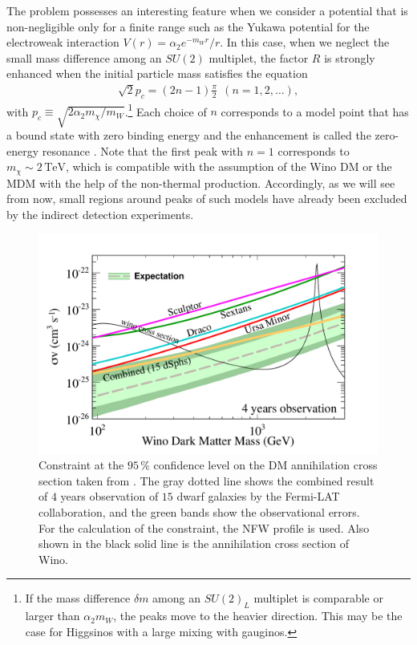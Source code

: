 \documentclass[12pt,twoside,book]{article}
\begin{document}
The problem possesses an interesting feature when we consider a potential that is non-negligible only for a finite range such as the Yukawa potential for the electroweak interaction $V(r) = \alpha_2 e^{-m_W r} / r$.
In this case, when we neglect the small mass difference among an $SU(2)$ multiplet, the factor $R$ is strongly enhanced when the initial particle mass satisfies the equation
\begin{align}
  \sqrt{2} p_c = (2n - 1) \frac{\pi}{2}~~(n = 1, 2, \dots),
\end{align}
with $p_c \equiv \sqrt{2 \alpha_2 m_\chi / m_W}$.\footnote{
  If the mass difference $\delta m$ among an $SU(2)_L$ multiplet is comparable or larger than $\alpha_2 m_W$, the peaks move to the heavier direction.
  This may be the case for Higgsinos with a large mixing with gauginos.
}
Each choice of $n$ corresponds to a model point that has a bound state with zero binding energy and the enhancement is called the zero-energy resonance \cite{Landau1981Quantum}.
Note that the first peak with $n=1$ corresponds to $m_\chi \sim 2\,\mathrm{TeV}$, which is compatible with the assumption of the Wino DM or the MDM with the help of the non-thermal production.
Accordingly, as we will see from now, small regions around peaks of such models have already been excluded by the indirect detection experiments.

\begin{figure}[t]
  \centering
  \includegraphics[width=0.6\hsize]{Present_limit.pdf}
  \caption{
    Constraint at the $95\,\%$ confidence level on the DM annihilation cross section taken from \cite{Bhattacherjee:2014dya}.
    The gray dotted line shows the combined result of $4$ years observation of $15$ dwarf galaxies by the Fermi-LAT collaboration, and the green bands show the observational errors.
    For the calculation of the constraint, the NFW profile is used.
    Also shown in the black solid line is the annihilation cross section of Wino.
  }
  \label{fig:indirect_current}
\end{figure}
\end{document}
